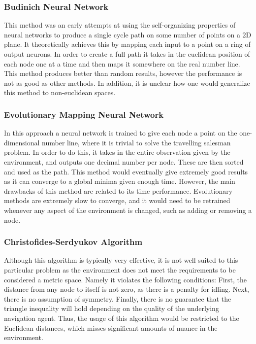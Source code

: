 \documentclass{article}
\begin{document}
    \subsubsection{Budinich Neural Network}
    This method was an early attempts at using the self-organizing properties of neural networks to produce a single cycle path on some number of points on a 2D plane. It theoretically achieves this by mapping each input to a point on a ring of output neurons. In order to create a full path it takes in the euclidean position of each node one at a time and then maps it somewhere on the real number line. This method produces better than random results, however the performance is not as good as other methods. In addition, it is unclear how one would generalize this method to non-euclidean spaces.
    
    \subsubsection{Evolutionary Mapping Neural Network}
    \label{evol_nn}
    In this approach a neural network is trained to give each node a point on the one-dimensional number line, where it is trivial to solve the travelling salesman problem. In order to do this, it takes in the entire observation given by the environment, and outputs one decimal number per node. These are then sorted and used as the path. This method would eventually give extremely good results as it can converge to a global minima given enough time. However, the main drawbacks of this method are related to its time performance. Evolutionary methods are extremely slow to converge, and it would need to be retrained whenever any aspect of the environment is changed, such as adding or removing a node.
    
    \subsubsection{Christofides-Serdyukov Algorithm}
    Although this algorithm is typically very effective, it is not well suited to this particular problem as the environment does not meet the requirements to be considered a metric space. Namely it violates the following conditions: First, the distance from any node to itself is not zero, as there is a penalty for idling. Next, there is no assumption of symmetry. Finally, there is no guarantee that the triangle inequality will hold depending on the quality of the underlying navigation agent. Thus, the usage of this algorithm would be restricted to the Euclidean distances, which misses significant amounts of nuance in the environment.
    
\end{document}
